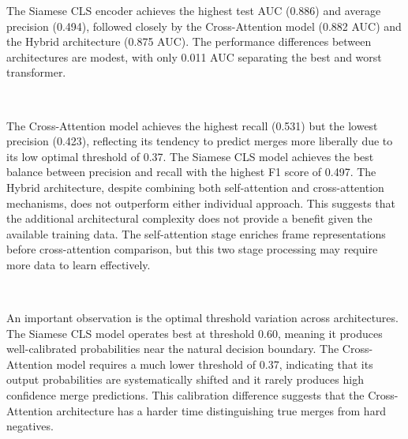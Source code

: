 \begin{table}[H]
\centering
{}
\caption{Comparison of transformer architectures on the test set. All models trained with real+synthetic data.}
\label{tab:architecture_comparison}
\end{table}

The Siamese CLS encoder achieves the highest test AUC (0.886) and average precision (0.494), followed closely by the Cross-Attention model (0.882 AUC) and the Hybrid architecture (0.875 AUC). The performance differences between architectures are modest, with only 0.011 AUC separating the best and worst transformer.

\

The Cross-Attention model achieves the highest recall (0.531) but the lowest precision (0.423), reflecting its tendency to predict merges more liberally due to its low optimal threshold of 0.37. The Siamese CLS model achieves the best balance between precision and recall with the highest F1 score of 0.497. The Hybrid architecture, despite combining both self-attention and cross-attention mechanisms, does not outperform either individual approach. This suggests that the additional architectural complexity does not provide a benefit given the available training data. The self-attention stage enriches frame representations before cross-attention comparison, but this two stage processing may require more data to learn effectively.

\

An important observation is the optimal threshold variation across architectures. The Siamese CLS model operates best at threshold 0.60, meaning it produces well-calibrated probabilities near the natural decision boundary. The Cross-Attention model requires a much lower threshold of 0.37, indicating that its output probabilities are systematically shifted and it rarely produces high confidence merge predictions. This calibration difference suggests that the Cross-Attention architecture has a harder time distinguishing true merges from hard negatives.


